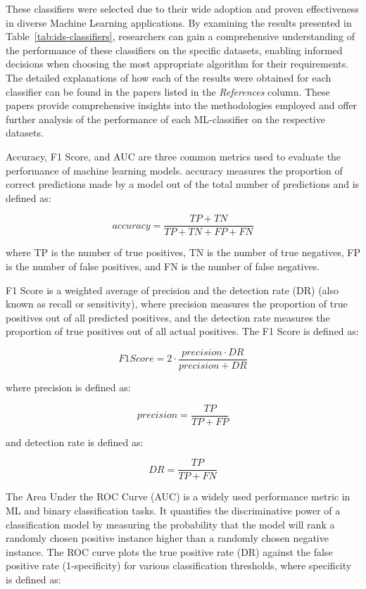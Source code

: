 These classifiers were selected due to their wide adoption and proven effectiveness in diverse Machine Learning
applications.
By examining the results presented in Table~\ref{tab:ids-classifiers}, researchers can gain a comprehensive
understanding of the performance of these classifiers on the specific datasets, enabling informed decisions when choosing
the most appropriate algorithm for their requirements.
The detailed explanations of how each of the results were obtained for each classifier can be found in the papers listed
in the \textit{References} column.
These papers provide comprehensive insights into the methodologies employed and offer further analysis of the performance
of each ML-classifier on the respective datasets.

Accuracy, F1 Score, and AUC are three common metrics used to evaluate the performance of machine learning models.
accuracy measures the proportion of correct predictions made by a model out of the total number of predictions and is
defined as:

\[accuracy = \frac{TP + TN}{TP + TN + FP + FN}\]

where TP is the number of true positives, TN is the number of true negatives, FP is the number of false positives,
and FN is the number of false negatives.

F1 Score is a weighted average of precision and the detection rate (DR) (also known as recall or sensitivity),
where precision measures the proportion of true positives
out of all predicted positives, and the detection rate measures the proportion of true positives out of all actual positives.
The F1 Score is defined as:

\[F1 Score = 2 \cdot \frac{precision \cdot DR}{precision + DR}\]

where precision is defined as:

\[precision = \frac{TP}{TP + FP}\]

and detection rate is defined as:

\[DR = \frac{TP}{TP + FN}\]

The Area Under the ROC Curve (AUC) is a widely used performance metric in ML and binary classification tasks.
It quantifies the discriminative power of a classification model by measuring the probability that the model will rank a
randomly chosen positive instance higher than a randomly chosen negative instance.
The ROC curve plots the true positive rate (DR) against the false positive rate (1-specificity)
for various classification thresholds, where specificity is defined as:

